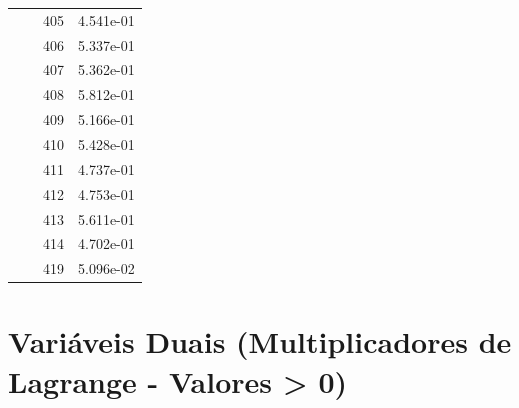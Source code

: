 \documentclass[12pt]{article}
\begin{document}
\begin{longtable}{@{}cccc@{}}
 &  & 405 & 4.541e-01 \\
 &  & 406 & 5.337e-01 \\
 &  & 407 & 5.362e-01 \\
 &  & 408 & 5.812e-01 \\
 &  & 409 & 5.166e-01 \\
 &  & 410 & 5.428e-01 \\
 &  & 411 & 4.737e-01 \\
 &  & 412 & 4.753e-01 \\
 &  & 413 & 5.611e-01 \\
 &  & 414 & 4.702e-01 \\
 &  & 419 & 5.096e-02 \\

\bottomrule
\end{longtable}


\section{Variáveis Duais (Multiplicadores de Lagrange - Valores > 0)}
\end{document}
